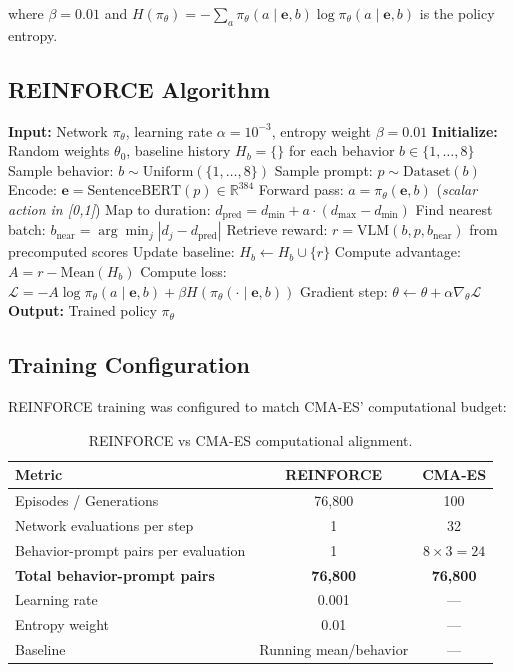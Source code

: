 \documentclass{article}
\begin{document}
where $\beta = 0.01$ and $H(\pi_\theta) = -\sum_a \pi_\theta(a \mid \mathbf{e}, b) \log \pi_\theta(a \mid \mathbf{e}, b)$ is the policy entropy.

\subsection{REINFORCE Algorithm}

\begin{algorithm}[h]
\caption{REINFORCE for P2I Network Training}
\begin{algorithmic}[1]
\State \textbf{Input:} Network $\pi_\theta$, learning rate $\alpha = 10^{-3}$, entropy weight $\beta = 0.01$
\State \textbf{Initialize:} Random weights $\theta_0$, baseline history $H_b = \{\}$ for each behavior $b \in \{1, \ldots, 8\}$
  \State Sample behavior: $b \sim \text{Uniform}(\{1, \ldots, 8\})$
  \State Sample prompt: $p \sim \text{Dataset}(b)$
  \State Encode: $\mathbf{e} = \text{SentenceBERT}(p) \in \mathbb{R}^{384}$
  \State Forward pass: $a = \pi_\theta(\mathbf{e}, b)$  (\textit{scalar action in [0,1]})
  \State Map to duration: $d_{\text{pred}} = d_{\min} + a \cdot (d_{\max} - d_{\min})$
  \State Find nearest batch: $b_{\text{near}} = \arg\min_j |d_j - d_{\text{pred}}|$
  \State Retrieve reward: $r = \text{VLM}(b, p, b_{\text{near}})$ from precomputed scores
  \State Update baseline: $H_b \gets H_b \cup \{r\}$
  \State Compute advantage: $A = r - \text{Mean}(H_b)$
  \State Compute loss: $\mathcal{L} = -A \log \pi_\theta(a \mid \mathbf{e}, b) + \beta H(\pi_\theta(\cdot \mid \mathbf{e}, b))$
  \State Gradient step: $\theta \gets \theta + \alpha \nabla_\theta \mathcal{L}$
\EndFor
\State \textbf{Output:} Trained policy $\pi_\theta$
\end{algorithmic}
\end{algorithm}

\subsection{Training Configuration}

REINFORCE training was configured to match CMA-ES' computational budget:

\begin{table}[h]
\centering
\caption{REINFORCE vs CMA-ES computational alignment.}
\begin{tabular}{lcc}
\toprule
\textbf{Metric} & \textbf{REINFORCE} & \textbf{CMA-ES} \\
\midrule
Episodes / Generations & 76,800 & 100 \\
Network evaluations per step & 1 & 32 \\
Behavior-prompt pairs per evaluation & 1 & $8 \times 3 = 24$ \\
\midrule
\textbf{Total behavior-prompt pairs} & \textbf{76,800} & \textbf{76,800} \\
\midrule
Learning rate & 0.001 & — \\
Entropy weight & 0.01 & — \\
Baseline & Running mean/behavior & — \\
\bottomrule
\end{tabular}
\end{table}
\end{document}
